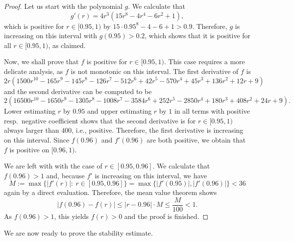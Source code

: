 \documentclass[12pt,a4paper]{article}
\theoremstyle{definition}
\begin{document}
\begin{proof}
Let us start with the polynomial $g$. We calculate that
$$g'(r)= 4 r^3 (15 r^8 - 4 r^4 - 6 r^2 + 1), $$
which is positive for $r \in [0.95,1)$ by $15 \cdot 0.95^8 - 4 - 6 + 1 > 0.9$. Therefore, $g$ is increasing on this interval with $g(0.95) > 0.2$, which shows that it is positive for all $r \in [0.95,1)$, as claimed.

Now, we shall prove that $f$ is positive for $r \in [0.95, 1)$. This case requires a more delicate analysis, as $f$ is not monotonic on this interval. The first derivative of $f$ is
$$ 2 r (1500 r^{10} - 165 r^9 - 145 r^8 - 126 r^7 - 512 r^6 + 42 r^5 - 570 r^4 + 45 r^3 + 136 r^2 + 12 r + 9) $$
and the second derivative can be computed to be
$$ 2 (16500 r^{10} - 1650 r^9 - 1305 r^8 - 1008 r^7 - 3584 r^6 + 252 r^5 - 2850 r^4 + 180 r^3 + 408 r^2 + 24 r + 9). $$
Lower estimating $r$ by $0.95$ and upper estimating $r$ by $1$ in all terms with positive resp.~negative coefficient shows that the second derivative is for $r \in [0.95,1)$ always larger than $400$, i.e., positive. Therefore, the first derivative is increasing on this interval. Since $f(0.96)$ and $f'(0.96)$ are both positive, we obtain that $f$ is positive on $[0.96,1)$.

We are left with with the case of $r \in [0.95, 0.96]$. We calculate that $f(0.96)>1$ and, because $f'$ is increasing on this interval, we have
$$ M := \max\{|f'(r)|: \ r \in [0.95, 0.96]\} = \max\{|f'(0.95)|, |f'(0.96)|\} < 36 $$
again by a direct evaluation. Therefore, the mean value theorem shows
$$ |f(0.96) - f(r)| \leq |r-0.96| \cdot M \leq \frac{M}{100} < 1. $$
As $f(0.96)>1$, this yields $f(r) > 0$ and the proof is finished.
\end{proof}



We are now ready to prove the stability estimate.
\end{document}
